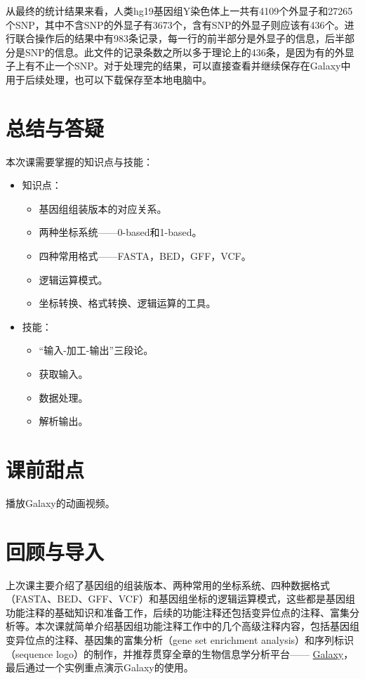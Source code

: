 从最终的统计结果来看，人类hg19基因组Y染色体上一共有4109个外显子和27265个SNP，其中不含SNP的外显子有3673个，含有SNP的外显子则应该有436个。进行联合操作后的结果中有983条记录，每一行的前半部分是外显子的信息，后半部分是SNP的信息。此文件的记录条数之所以多于理论上的436条，是因为有的外显子上有不止一个SNP。对于处理完的结果，可以直接查看并继续保存在Galaxy中用于后续处理，也可以下载保存至本地电脑中。

\section{总结与答疑}
本次课需要掌握的知识点与技能：
\begin{itemize}
	\item 知识点：
		\begin{itemize}
			\item 基因组组装版本的对应关系。
			\item 两种坐标系统——0-based和1-based。
			\item 四种常用格式——FASTA，BED，GFF，VCF。
			\item 逻辑运算模式。
			\item 坐标转换、格式转换、逻辑运算的工具。
		\end{itemize}
	\item 技能：
		\begin{itemize}
			\item “输入-加工-输出”三段论。
			\item 获取输入。
			\item 数据处理。
			\item 解析输出。
		\end{itemize}
\end{itemize}

\section{课前甜点} 
播放Galaxy的动画视频。

\section{回顾与导入}
上次课主要介绍了基因组的组装版本、两种常用的坐标系统、四种数据格式（FASTA、BED、GFF、VCF）和基因组坐标的逻辑运算模式，这些都是基因组功能注释的基础知识和准备工作，后续的功能注释还包括变异位点的注释、富集分析等。本次课就简单介绍基因组功能注释工作中的几个高级注释内容，包括基因组变异位点的注释、基因集的富集分析（gene set enrichment analysis）和序列标识（sequence logo）的制作，并推荐贯穿全章的生物信息学分析平台—— \href{http://galaxyproject.org}{Galaxy}，最后通过一个实例重点演示Galaxy的使用。

